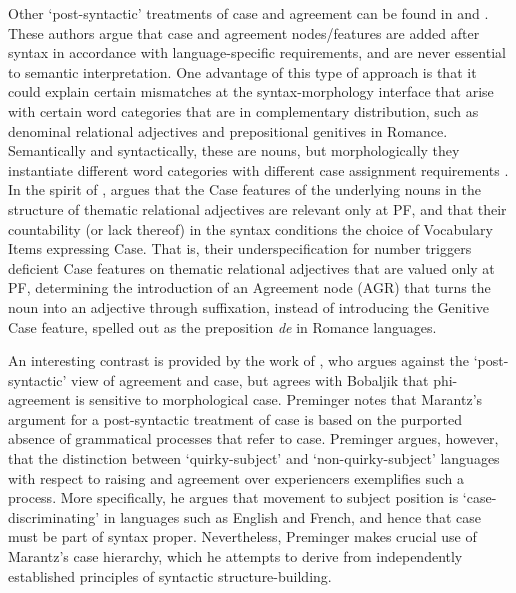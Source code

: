 \documentclass[output=paper]{langsci/langscibook}
\begin{document}
Other ‘post-syntactic’ treatments of case and agreement can be found in \citet{Embick2006} and \citet{Marchis2015,Marchis2018}. These authors argue that case and agreement nodes\slash features are added after syntax in accordance with language-specific requirements, and are never essential to semantic interpretation. One advantage of this type of approach is that it could explain certain mismatches at the syntax-morphology interface that arise with certain word categories that are in complementary distribution, such as denominal relational adjectives and prepositional genitives in Romance. Semantically and syntactically, these are nouns, but morphologically they instantiate different word categories with different case assignment requirements \citep{Marchis2018}. In the spirit of \citet{Embick2006},  \citet{Marchis2015,Marchis2018} argues that the Case features of the underlying nouns in the structure of thematic relational adjectives are relevant only at PF, and that their countability (or lack thereof) in the syntax conditions the choice of Vocabulary Items expressing Case. That is, their underspecification for number triggers deficient Case features on thematic relational adjectives that are valued only at PF, determining the introduction of an Agreement node (AGR) that turns the noun into an adjective through suffixation, instead of introducing the Genitive Case feature, spelled out as the preposition \textit{de} in Romance languages. 

An interesting contrast is provided by the work of \citet{Preminger2014}, who argues against the ‘post-syntactic’ view of agreement and case, but agrees with Bobaljik that phi-agreement is sensitive to morphological case. Preminger notes that Marantz’s argument for a post-syntactic treatment of case is based on the purported absence of grammatical processes that refer to case. Preminger argues, however, that the distinction between ‘quirky-subject’ and ‘non-quirky-subject’ languages with respect to raising and agreement over experiencers exemplifies such a process. More specifically, he argues that movement to subject position is ‘case-discriminating’ in languages such as English and French, and hence that case must be part of syntax proper. Nevertheless, Preminger makes crucial use of Marantz’s case hierarchy, which he attempts to derive from independently established principles of syntactic structure-building.
\end{document}
